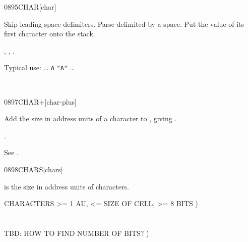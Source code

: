 \begin{worddef}{0895}{CHAR}[char]
\item {}

	Skip leading space delimiters. Parse  delimited by
	a space. Put the value of its first character onto the stack.

\see {},
	,
	.

	\begin{rationale} %
		Typical use: {\ldots}
			 \texttt{A}  \texttt{"A"} {\ldots}
	\end{rationale}

	\begin{testing} %
		 \\
	\end{testing}
\end{worddef}


\begin{worddef}{0897}{CHAR+}[char-plus]
\item {}

	Add the size in address units of a character to
	, giving .

\see {}.

	\begin{testing} %
		See .
	\end{testing}
\end{worddef}


\begin{worddef}{0898}{CHARS}[chars]
\item {}

	 is the size in address units of 
	characters.

	\begin{testing} %
		\ttfamily
		 CHARACTERS >= 1 AU, <= SIZE OF CELL, >= 8 BITS ) \\
		 \\
		 \\
		 TBD: HOW TO FIND NUMBER OF BITS? )
	\end{testing}
\end{worddef}


